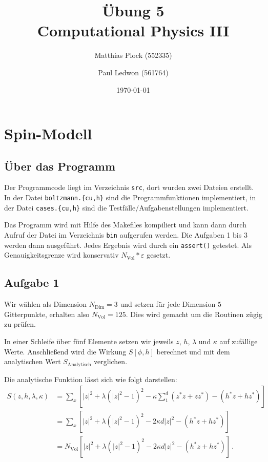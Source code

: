 \documentclass[10pt,a4paper]{article}
\title{Übung 5 \\Computational Physics III}
\author{Matthias Plock (552335) \and Paul Ledwon (561764)} %
\date{\today}
\begin{document}
\maketitle
\tableofcontents

\pagestyle{myheadings}                  %

\section{Spin-Modell}

\subsection{Über das Programm}

Der Programmcode liegt im Verzeichnis \texttt{src}, dort wurden zwei Dateien
erstellt. In der Datei \texttt{boltzmann.\{cu,h\}} sind die Programmfunktionen
implementiert, in der Datei \texttt{cases.\{cu,h\}} sind die
Testfälle/Aufgabenstellungen implementiert.

Das Programm wird mit Hilfe des Makefiles kompiliert und kann dann durch Aufruf
der Datei im Verzeichnis \texttt{bin} aufgerufen werden.
Die Aufgaben 1 bis 3 werden dann ausgeführt. Jedes Ergebnis wird durch ein
\texttt{assert()} getestet. Als Genauigkeitsgrenze wird konservativ
$N_{\text{Vol}}*\varepsilon$ gesetzt.

\subsection{Aufgabe 1}

Wir wählen als Dimension $N_{\text{Dim}} = 3$ und setzen für jede Dimension $5$
Gitterpunkte, erhalten also $N_{\text{Vol}} = 125$. Dies wird gemacht um die
Routinen zügig zu prüfen.

In einer Schleife über fünf Elemente setzen wir jeweils $z$, $h$, $\lambda$ und
$\kappa$ auf zufällige Werte. Anschließend wird die Wirkung $S\left[ \phi, h
\right]$ berechnet und mit dem analytischen Wert $S_{\text{Analytisch}}$
verglichen.

Die analytische Funktion lässt sich wie folgt darstellen:
\begin{align*}
  S(z, h, \lambda, \kappa)
  &=
    \sum_{x} \left[ |z|^{2} + \lambda \left( |z|^{2} - 1 \right)^{2} -
    \kappa \sum_{1}^{d} \left( z^{*}z + z z^{*}\right) -
    \left( h^{*}z + h z^{*} \right) \right]\\
  &=
    \sum_{x} \left[ |z|^{2} + \lambda \left( |z|^{2} - 1 \right)^{2} -
    2 \kappa d |z|^{2} -
    \left( h^{*}z + h z^{*} \right) \right]\\
  &=
    N_{\text{Vol}} \left[ |z|^{2} + \lambda \left( |z|^{2} - 1 \right)^{2} -
    2 \kappa d |z|^{2} -
    \left( h^{*}z + h z^{*} \right) \right]\,.
\end{align*}
\end{document}
